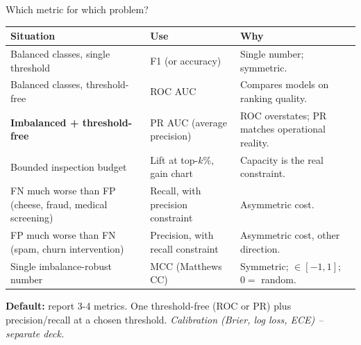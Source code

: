 \documentclass[aspectratio=169]{beamer}
\begin{document}
\begin{frame}{Which metric for which problem?}
  \begin{center}\small
    \begin{tabular}{p{4.5cm} p{4.5cm} p{4cm}}
      \textbf{Situation} & \textbf{Use} & \textbf{Why} \\ \hline
      Balanced classes, single threshold & F1 (or accuracy) & Single number; symmetric. \\
      Balanced classes, threshold-free & ROC AUC & Compares models on ranking quality. \\
      \textbf{Imbalanced + threshold-free} & PR AUC (average precision) & ROC overstates; PR matches operational reality. \\
      Bounded inspection budget & Lift at top-$k$\%, gain chart & Capacity is the real constraint. \\
      FN much worse than FP (cheese, fraud, medical screening) & Recall, with precision constraint & Asymmetric cost. \\
      FP much worse than FN (spam, churn intervention) & Precision, with recall constraint & Asymmetric cost, other direction. \\
      Single imbalance-robust number & MCC (Matthews CC) & Symmetric; $\in [-1, 1]$; $0 =$ random. \\
    \end{tabular}
  \end{center}
  \vfill
  \scriptsize \textbf{Default:} report 3-4 metrics. One threshold-free (ROC or PR) plus precision/recall at a chosen threshold. \emph{Calibration (Brier, log loss, ECE) -- separate deck.}
\end{frame}
\end{document}
